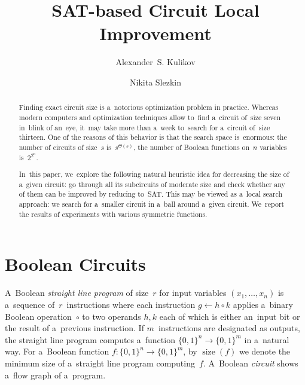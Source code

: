 \documentclass[12pt,letterpaper]{article}
\DeclareMathOperator{\size}{size}
\begin{document}
\sloppy

\title{SAT-based Circuit Local Improvement}
\author{Alexander~S. Kulikov \and Nikita Slezkin}
\maketitle

\begin{abstract}
Finding exact circuit size 
is a~notorious optimization
problem in practice. Whereas modern computers 
and optimization techniques allow to~find a~circuit 
of~size seven in~blink of an~eye, it~may take more 
than a~week to~search for a~circuit of~size thirteen.
One of the reasons of this behavior is that the search 
space is~enormous: the number of circuits of size~$s$ 
is~$s^{\Theta(s)}$, the number of Boolean functions on~$n$ variables is~$2^{2^n}$.

In~this paper, we~explore the following natural
heuristic idea for decreasing the size of
a~given circuit: go through all its subcircuits
of moderate size and check whether 
any of them can be improved by reducing to~SAT. 
This may be viewed
as a~local search approach: we search for a~smaller
circuit in a~ball around a~given circuit.
We~report the results of experiments with various symmetric functions. 
\end{abstract}



\section{Boolean Circuits}
A~Boolean \emph{straight line program} 
of size~$r$ for input variables $(x_1, \dotsc, x_n)$ 
is a~sequence of~$r$~instructions where each 
instruction $g \gets h \circ k$ 
applies a~binary Boolean operation~$\circ$ to 
two operands $h,k$ each of which is either an~input bit 
or the result of a~previous instruction. 
If $m$~instructions are designated as outputs,
the straight line program computes a~function 
$\{0,1\}^n \to \{0,1\}^m$ in a~natural way. For 
a~Boolean function $f \colon \{0,1\}^n \to \{0,1\}^m$,
by $\size(f)$ we denote the minimum size of 
a~straight line program
computing~$f$. A~Boolean \emph{circuit} 
shows a~flow graph of a~program.
\end{document}
